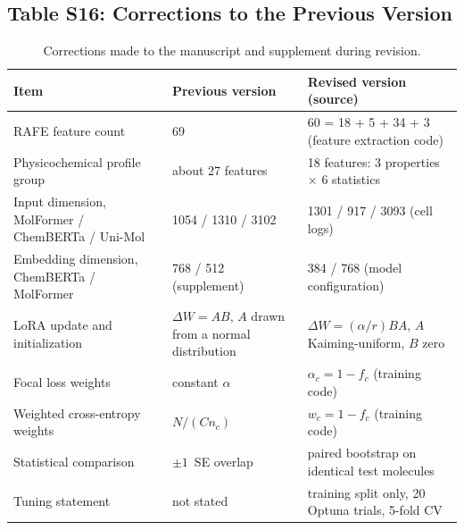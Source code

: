 \documentclass[9pt,a4paper]{article}
\begin{document}
\subsection*{Table S16: Corrections to the Previous Version}
\begin{table}[htbp]
\centering
\caption{Corrections made to the manuscript and supplement during revision.}
\begin{tabular}{p{4.2cm}p{4.3cm}p{5.2cm}}
\toprule
Item & Previous version & Revised version (source) \\
\midrule
RAFE feature count & 69 & 60 = 18 + 5 + 34 + 3 (feature extraction code) \\
Physicochemical profile group & about 27 features & 18 features: 3 properties $\times$ 6 statistics \\
Input dimension, MolFormer / ChemBERTa / Uni-Mol & 1054 / 1310 / 3102 & 1301 / 917 / 3093 (cell logs) \\
Embedding dimension, ChemBERTa / MolFormer & 768 / 512 (supplement) & 384 / 768 (model configuration) \\
LoRA update and initialization & $\Delta W = AB$, $A$ drawn from a normal distribution & $\Delta W = (\alpha/r)BA$, $A$ Kaiming-uniform, $B$ zero \\
Focal loss weights & constant $\alpha$ & $\alpha_c = 1 - f_c$ (training code) \\
Weighted cross-entropy weights & $N/(C n_c)$ & $w_c = 1 - f_c$ (training code) \\
Statistical comparison & $\pm1$~SE overlap & paired bootstrap on identical test molecules \\
Tuning statement & not stated & training split only, 20 Optuna trials, 5-fold CV \\
\bottomrule
\end{tabular}
\end{table}



\end{document}
